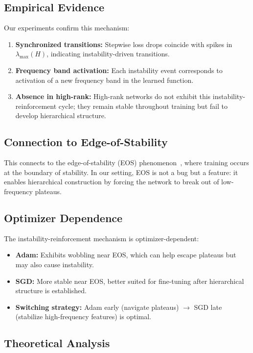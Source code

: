 \subsection{Empirical Evidence}

Our experiments confirm this mechanism:

\begin{enumerate}
    \item \textbf{Synchronized transitions:} Stepwise loss drops coincide with spikes in $\lambda_{\max}(H)$, indicating instability-driven transitions.
    \item \textbf{Frequency band activation:} Each instability event corresponds to activation of a new frequency band in the learned function.
    \item \textbf{Absence in high-rank:} High-rank networks do not exhibit this instability-reinforcement cycle; they remain stable throughout training but fail to develop hierarchical structure.
\end{enumerate}

\subsection{Connection to Edge-of-Stability}

This connects to the edge-of-stability (EOS) phenomenon~\cite{cohen2021gradient}, where training occurs at the boundary of stability. In our setting, EOS is not a bug but a feature: it enables hierarchical construction by forcing the network to break out of low-frequency plateaus.

\subsection{Optimizer Dependence}

The instability-reinforcement mechanism is optimizer-dependent:
\begin{itemize}
    \item \textbf{Adam:} Exhibits wobbling near EOS, which can help escape plateaus but may also cause instability.
    \item \textbf{SGD:} More stable near EOS, better suited for fine-tuning after hierarchical structure is established.
    \item \textbf{Switching strategy:} Adam early (navigate plateaus) $\to$ SGD late (stabilize high-frequency features) is optimal.
\end{itemize}

\subsection{Theoretical Analysis}

